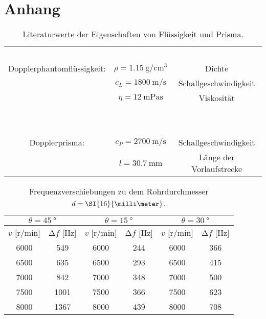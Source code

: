\section{Anhang}

\begin{table}
    \centering
    \caption{Literaturwerte der Eigenschaften von Flüssigkeit und Prisma. \cite{skript}}
    \label{tab:lit}
    \begin{tabular}{c c c}
        \toprule
        ~  & ~ & ~\\
        Dopplerphantomflüssigkeit: & $\rho = \SI{1.15}{\gram\per\centi\meter\tothe{3}}$ & Dichte \\
        ~  &  $c_{L} = \SI{1800}{\meter\per\second}$  & Schallgeschwindigkeit \\
        ~ & $\eta = \SI{12}{\milli\pascal\second}$ & Viskosität \\
        ~ & ~ & ~ \\
        \midrule
        ~ & ~ & ~ \\
        Dopplerprisma: & $c_{P} = \SI{2700}{\meter\per\second}$  & Schallgeschwindigkeit \\
        ~ & $l = \SI{30.7}{\milli\meter}$ & Länge der Vorlaufstrecke
    \end{tabular}
\end{table}

\begin{table}
    \centering
    \caption{Frequenzverschiebungen zu dem Rohrdurchmesser $\protect d = \SI{16}{\milli\meter}$.}
    \label{tab:1}
    \begin{tabular}{c c || c c || c c}
        \hline
        \multicolumn{2}{c}{$\theta = \SI{45}{\degree}$} & \multicolumn{2}{c}{$\theta = \SI{15}{\degree}$} & \multicolumn{2}{c}{$\theta = \SI{30}{\degree}$}\\
        \midrule
        $v$ [$\si{{\text{r}}\per\minute}$]  & $\increment f$ [$\si{\hertz}$] & $v$ [$\si{{\text{r}}\per\minute}$]  & $\increment f$ [$\si{\hertz}$]&  $v$ [$\si{{\text{r}}\per\minute}$]  & $\increment f$ [$\si{\hertz}$]\\
        \midrule
        6000    &   549     & 6000  & 244  & 6000 & 366  \\ 
        6500    &   635     & 6500  & 293  & 6500 & 415  \\ 
        7000    &   842     & 7000  & 348  & 7000 & 500  \\ 
        7500    &   1001    & 7500  & 366  & 7500 & 623  \\ 
        8000    &   1367    & 8000  & 439  & 8000 & 708  \\  
        \bottomrule
    \end{tabular}
\end{table}

